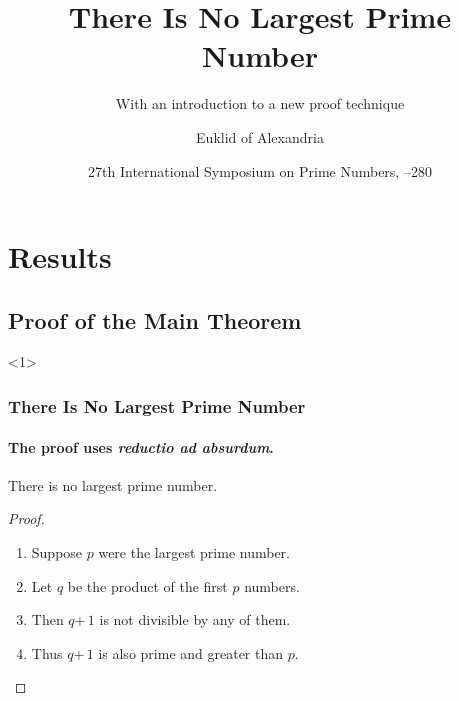 

\beamertemplatetransparentcovered

\usepackage{times}

\title{There Is No Largest Prime Number}
\subtitle{With an introduction to a new proof technique}

\author[Euklid]{Euklid of Alexandria}
\date[ISPN '80]{27th International Symposium on Prime Numbers, --280}



\START
\showoutput

\begin{frame}
  \titlepage
  \tableofcontents
\end{frame}

\section{Results}
\subsection{Proof of the Main Theorem}

\begin{frame}<1>
  \frametitle{There Is No Largest Prime Number}
  \framesubtitle{The proof uses \textit{reductio ad absurdum}.}

  \begin{theorem}
    There is no largest prime number.
  \end{theorem}
  \begin{proof}
    \begin{enumerate}
    \item<1-| alert@1> Suppose $p$ were the largest prime number.
    \item<2-> Let $q$ be the product of the first $p$ numbers.
    \item<3-> Then $q$\;+\,$1$ is not divisible by any of them.
    \item<1-> Thus $q$\;+\,$1$ is also prime and greater than $p$.\qedhere
    \end{enumerate}
  \end{proof}
\end{frame}


